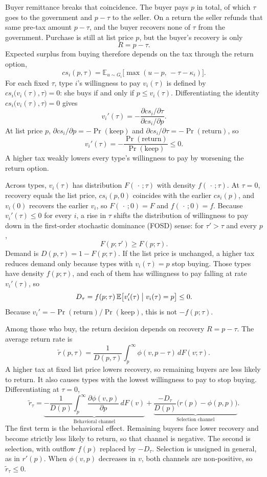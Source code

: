 \documentclass[11pt]{article}
\begin{document}
Buyer remittance breaks that coincidence.  The buyer pays $p$ in
total, of which $\tau$ goes to the government and $p-\tau$ to the seller.  On
a return the seller refunds that same pre-tax amount $p-\tau$, and the buyer
recovers none of $\tau$ from the government.  Purchase is still at list price
$p$, but the buyer's recovery is only
\[
  R=p-\tau.
\]
Expected surplus from buying therefore depends on the tax through the return
option,
\[
  cs_i(p,\tau)
  =\mathbb{E}_{u\sim G_i}\bigl[\max(u-p,\,-\tau-\kappa_i)\bigr].
\]
For each fixed $\tau$, type $i$'s willingness to pay $v_i(\tau)$ is defined by
$cs_i\bigl(v_i(\tau),\tau\bigr)=0$: she buys if and only if $p\leq v_i(\tau)$.
Differentiating the identity $cs_i\bigl(v_i(\tau),\tau\bigr)=0$ gives
\[
  v_i'(\tau)
  =-\frac{\partial cs_i/\partial\tau}{\partial cs_i/\partial p}.
\]
At list price $p$, $\partial cs_i/\partial p=-\Pr(\text{keep})$ and
$\partial cs_i/\partial\tau=-\Pr(\text{return})$, so
\[
  v_i'(\tau)
  =-\frac{\Pr(\text{return})}{\Pr(\text{keep})}
  \leq 0.
\]
A higher tax weakly lowers every type's willingness to pay by
worsening the return option.

Across types, $v_i(\tau)$ has distribution $F(\,\cdot\,;\tau)$ with density
$f(\,\cdot\,;\tau)$.  At $\tau=0$,
recovery equals the list price, $cs_i(p,0)$ coincides with the earlier $cs_i(p)$, and
$v_i(0)$ recovers the earlier $v_i$, so $F(\,\cdot\,;0)=F$ and $f(\,\cdot\,;0)=f$.
Because $v_i'(\tau)\leq 0$ for every $i$, a rise in $\tau$ shifts the distribution of
willingness to pay down in the first-order stochastic dominance (FOSD) sense:
for $\tau'>\tau$ and every $p$,
\[
  F(p;\tau')\geq F(p;\tau).
\]
Demand is $D(p,\tau)=1-F(p;\tau)$.  If the list price is unchanged, a higher
tax reduces demand only because types with $v_i(\tau)=p$ stop buying.  Those
types have density $f(p;\tau)$, and each of them has willingness to pay falling
at rate $v_i'(\tau)$, so
\[
  D_\tau
  =f(p;\tau)\,\mathbb{E}\bigl[v_i'(\tau)\bigm|v_i(\tau)=p\bigr]
  \leq 0.
\]
Because $v_i'=-\Pr(\text{return})/\Pr(\text{keep})$, this is not $-f(p;\tau)$.

Among those who buy, the return decision depends on recovery $R=p-\tau$.
The average return rate is
\begin{equation}
  \tilde{r}(p,\tau)
  =\frac{1}{D(p,\tau)}\int_p^\infty \phi(v,p-\tau)\,dF(v;\tau).
\end{equation}
A higher tax at fixed list price lowers recovery, so remaining buyers are
less likely to return.  It also causes types with the lowest willingness to
pay to stop buying.
Differentiating at $\tau=0$,
\[
  \tilde{r}_{\tau}
  =
  \underbrace{
    -\frac{1}{D(p)}\int_p^\infty \frac{\partial\phi(v,p)}{\partial p}\,dF(v)
  }_{\text{Behavioral channel}}
  +
  \underbrace{
    \frac{-D_{\tau}}{D(p)}\bigl(r(p)-\phi(p,p)\bigr)
  }_{\text{Selection channel}}.
\]
The first term is the behavioral effect.  Remaining buyers face lower recovery
and become strictly less likely to return, so that channel is negative.  The
second is selection, with outflow $f(p)$ replaced by $-D_{\tau}$.  Selection is
unsigned in general, as in $r'(p)$.  When $\phi(v,p)$ decreases in $v$, both
channels are non-positive, so $\tilde{r}_{\tau}\le 0$.
\end{document}
